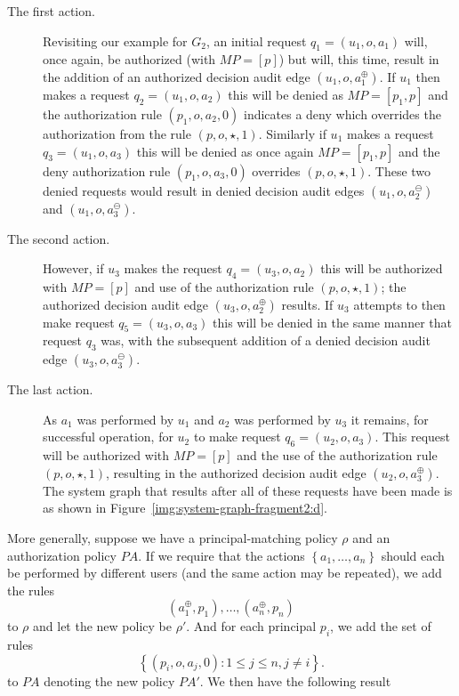 \documentclass{article}
\newcommand{\set}[1]{\ensuremath{\left\{#1\right\}}} \newcommand{\sett}[1]{\ensuremath{\left\{\textit{#1}\right\}}} \newcommand{\tuple}[1]{\ensuremath{\left(#1\right)}} \newcommand{\tuplet}[1]{\ensuremath{\left(\textit{#1}\right)}}
\newcommand{\audita}[1]{\ensuremath{#1^\oplus}}
\newcommand{\auditd}[1]{\ensuremath{#1^\ominus}}
\newcommand{\pa}{\mathit{PA}}
\renewcommand{\mp}{\mathit{MP}}
\begin{document}
\begin{description}
    \item[The first action.]
    Revisiting our example for $G_2$, an initial request $q_1 = (u_1,o,a_1)$ will, once again, be authorized (with $\mp = [p]$) but will, this time, result in the addition of an authorized decision audit edge $(u_1,o,\audita{a_1})$. If $u_1$ then makes a request $q_2 = (u_1,o,a_2)$ this will be denied as $\mp = [p_1,p]$ and the authorization rule $(p_1,o,a_2,0)$ indicates a deny which overrides the authorization from the rule $(p,o,\star,1)$.
    Similarly if $u_1$ makes a request $q_3 = (u_1,o,a_3)$ this will be denied as once again $\mp = [p_1,p]$ and the deny authorization rule $(p_1,o,a_3,0)$ overrides $(p,o,\star,1)$.
    These two denied requests would result in denied decision audit edges $(u_1,o,\auditd{a_2})$ and $(u_1,o,\auditd{a_3})$. 
    \item[The second action.]
    However, if $u_3$ makes the request $q_4 = (u_3,o,a_2)$ this will be authorized with $\mp = [p]$ and use of the authorization rule $(p,o,\star,1)$; the authorized decision audit edge $(u_3,o,\audita{a_2})$ results.
    If $u_3$ attempts to then make request $q_5 = (u_3,o,a_3)$ this will be denied in the same manner that request $q_3$ was, with the subsequent addition of a denied decision audit edge $(u_3,o,\auditd{a_3})$.

    \item[The last action.]
    As $a_1$ was performed by $u_1$ and $a_2$ was performed by $u_3$ it remains, for successful operation, for $u_2$ to make request $q_6 = (u_2,o,a_3)$.
    This request will be authorized with $\mp = [p]$ and the use of the authorization rule $(p,o,\star,1)$, resulting in the authorized decision audit edge $(u_2,o,\audita{a_3})$.
    The system graph that results after all of these requests have been made is as shown in Figure~\ref{img:system-graph-fragment2:d}.
\end{description}

More generally, suppose we have a principal-matching policy $\rho$ and an authorization policy $\pa$. If we require that the actions $\set{a_1,\dots,a_n}$ should each be performed by different users (and the same action may be repeated), we add the rules
\[
 (\audita{a_1},p_1), \dots, (\audita{a_n},p_n)
\]
to $\rho$ and let the new policy be $\rho'$. And for each principal $p_i$, we add the set of rules
\[
 \set{(p_i,o,a_j,0) :  1 \leq j \leq n, j \ne i}.
\]
to $\pa$ denoting the new policy $\pa'$. We then have the following result
\end{document}

